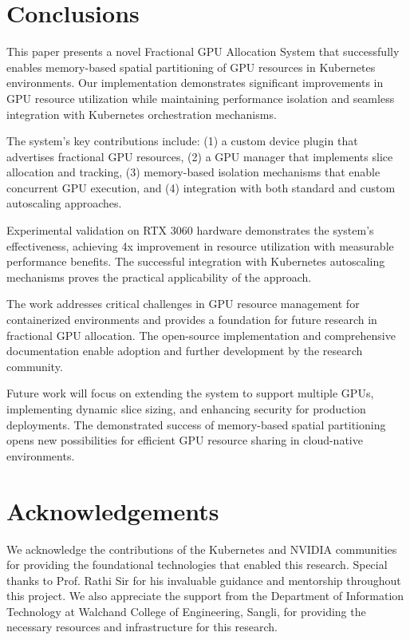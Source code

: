 \documentclass[10pt,twocolumn,letterpaper]{article}
\begin{document}
\section*{Conclusions}

This paper presents a novel Fractional GPU Allocation System that successfully enables memory-based spatial partitioning of GPU resources in Kubernetes environments. Our implementation demonstrates significant improvements in GPU resource utilization while maintaining performance isolation and seamless integration with Kubernetes orchestration mechanisms.

The system's key contributions include: (1) a custom device plugin that advertises fractional GPU resources, (2) a GPU manager that implements slice allocation and tracking, (3) memory-based isolation mechanisms that enable concurrent GPU execution, and (4) integration with both standard and custom autoscaling approaches.

Experimental validation on RTX 3060 hardware demonstrates the system's effectiveness, achieving 4x improvement in resource utilization with measurable performance benefits. The successful integration with Kubernetes autoscaling mechanisms proves the practical applicability of the approach.

The work addresses critical challenges in GPU resource management for containerized environments and provides a foundation for future research in fractional GPU allocation. The open-source implementation and comprehensive documentation enable adoption and further development by the research community.

Future work will focus on extending the system to support multiple GPUs, implementing dynamic slice sizing, and enhancing security for production deployments. The demonstrated success of memory-based spatial partitioning opens new possibilities for efficient GPU resource sharing in cloud-native environments.

\section*{Acknowledgements}

We acknowledge the contributions of the Kubernetes and NVIDIA communities for providing the foundational technologies that enabled this research. Special thanks to Prof. Rathi Sir for his invaluable guidance and mentorship throughout this project. We also appreciate the support from the Department of Information Technology at Walchand College of Engineering, Sangli, for providing the necessary resources and infrastructure for this research.
\end{document}
